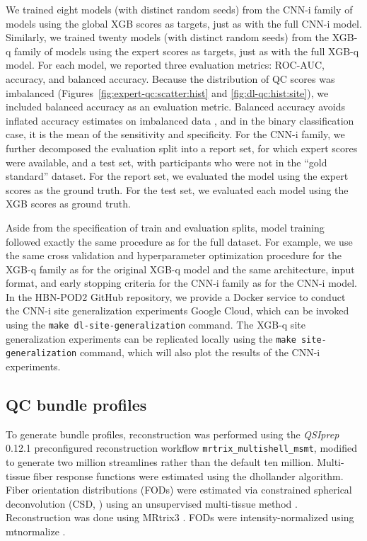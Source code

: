 \documentclass[9pt,lineno]{elife}
\begin{document}
We trained eight models (with distinct random seeds) from the CNN-i family of models using the global XGB scores as targets, just as with the full CNN-i model. Similarly, we trained twenty models (with distinct random seeds) from the XGB-q family of models using the expert scores as targets, just as with the full XGB-q model. For each model, we reported three evaluation metrics: ROC-AUC, accuracy, and balanced accuracy. Because the distribution of QC scores was imbalanced (Figures~\ref{fig:expert-qc:scatter:hist} and \ref{fig:dl-qc:hist:site}), we included balanced accuracy as an evaluation metric. Balanced accuracy avoids inflated accuracy estimates on imbalanced data \citep{velez2007balanced}, and in the binary classification case, it is the mean of the sensitivity and specificity. For the CNN-i family, we further decomposed the evaluation split into a report set, for which expert scores were available, and a test set, with participants who were not in the ``gold standard'' dataset. For the report set, we evaluated the model using the expert scores as the ground truth. For the test set, we evaluated each model using the XGB scores as ground truth.

Aside from the specification of train and evaluation splits, model training followed exactly the same procedure as for the full dataset. For example, we use the same cross validation and hyperparameter optimization procedure for the XGB-q family as for the original XGB-q model and the same architecture, input format, and early stopping criteria for the CNN-i family as for the CNN-i model. In the HBN-POD2 GitHub repository, we provide a Docker
service to conduct the CNN-i site generalization experiments Google Cloud, which can be invoked using the \texttt{make dl-site-generalization} command. The XGB-q site generalization experiments can be replicated locally using the \texttt{make site-generalization} command, which will also plot the results of the CNN-i experiments.

\subsection{QC bundle profiles}

To generate bundle profiles, reconstruction was performed using the
\emph{QSIprep} 0.12.1 preconfigured reconstruction workflow
\texttt{mrtrix\_multishell\_msmt}, modified to generate two million streamlines
rather than the default ten million. Multi-tissue fiber response functions were
estimated using the dhollander algorithm. Fiber orientation distributions (FODs) were estimated via constrained
spherical deconvolution (CSD, \citep{originalcsd, tournier2008csd}) using an
unsupervised multi-tissue method \citep{dhollander2019response,
dhollander2016unsupervised}. Reconstruction was done using MRtrix3
\citep{mrtrix3}. FODs were intensity-normalized using mtnormalize
\citep{mtnormalize}.
\end{document}
